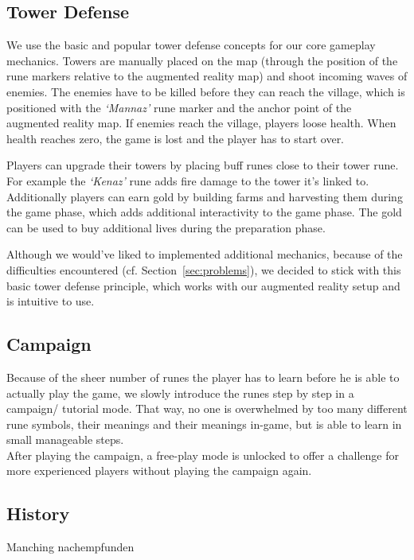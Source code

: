 
\subsection{Tower Defense}
\label{sec:game_design:subsec:tower_defense}

We use the basic and popular tower defense concepts for our core gameplay mechanics. Towers are manually placed on the map (through the position of the rune markers relative to the augmented reality map) and shoot incoming waves of enemies. The enemies have to be killed before they can reach the village, which is positioned with the \textit{`Mannaz'} rune marker and the anchor point of the augmented reality map.
If enemies reach the village, players loose health. When health reaches zero, the game is lost and the player has to start over.

Players can upgrade their towers by placing buff runes close to their tower rune. For example the \textit{`Kenaz'} rune adds fire damage to the tower it's linked to.
Additionally players can earn gold by building farms and harvesting them during the game phase, which adds additional interactivity to the game phase.
The gold can be used to buy additional lives during the preparation phase.

Although we would've liked to implemented additional mechanics, because of the difficulties encountered (cf. Section~\ref{sec:problems}), we decided to stick with this basic tower defense principle, which works with our augmented reality setup and is intuitive to use.


\subsection{Campaign}
\label{sec:game_design:subsec:campaign}

Because of the sheer number of runes the player has to learn before he is able to actually play the game, we slowly introduce the runes step by step in a campaign/ tutorial mode. That way, no one is overwhelmed by too many different rune symbols, their meanings and their meanings in-game, but is able to learn in small manageable steps. \\
After playing the campaign, a free-play mode is unlocked to offer a challenge for more experienced players without playing the campaign again. \\

\subsection{History}
\label{sec:game_design:subsec:history}


Manching nachempfunden

